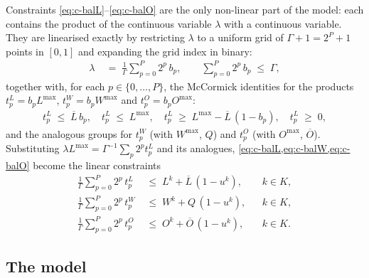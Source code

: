 \documentclass[11pt,a4paper]{article}
\theoremstyle{definition}
\theoremstyle{plain}
\newcommand{\Veh}{K}
\newcommand{\Lmax}{L^{\max}}
\newcommand{\Wmax}{W^{\max}}
\newcommand{\Omax}{O^{\max}}
\newcommand{\Lub}{\overline{L}}
\newcommand{\Oub}{\overline{O}}
\begin{document}
Constraints \eqref{eq:c-balL}--\eqref{eq:c-balO} are the only non-linear part
of the model: each contains the product of the continuous variable $\lambda$
with a continuous variable.  They are linearised exactly by restricting
$\lambda$ to a uniform grid of $\Gamma + 1 = 2^P + 1$ points in $[0,1]$ and
expanding the grid index in binary:
\begin{align}
  \lambda &\;=\; \frac{1}{\Gamma} \sum_{p=0}^{P} 2^{p}\, b_p,
  \qquad
  \sum_{p=0}^{P} 2^{p}\, b_p \;\le\; \Gamma,
  \label{eq:c-lambda-exp}
\end{align}
together with, for each $p \in \{0,\dots,P\}$, the McCormick identities for the
products $t^L_p = b_p \Lmax$, $t^W_p = b_p \Wmax$ and $t^O_p = b_p \Omax$:
\begin{align}
  t^{L}_p \;\le\; \Lub\, b_p, \quad
  t^{L}_p \;\le\; \Lmax, \quad
  t^{L}_p \;\ge\; \Lmax - \Lub\,(1 - b_p), \quad
  t^{L}_p \;\ge\; 0,
  \label{eq:c-mcL}
\end{align}
and the analogous groups for $t^W_p$ (with $\Wmax$, $Q$) and $t^O_p$ (with
$\Omax$, $\Oub$).  Substituting
$\lambda \Lmax = \Gamma^{-1} \sum_p 2^p t^L_p$ and its analogues,
\cref{eq:c-balL,eq:c-balW,eq:c-balO} become the linear constraints
\begin{align}
  \frac{1}{\Gamma} \sum_{p=0}^{P} 2^{p}\, t^{L}_p
    &\;\le\; L^k + \Lub\,(1-u^k), & &k \in \Veh,
  \label{eq:c-balL-lin}\\
  \frac{1}{\Gamma} \sum_{p=0}^{P} 2^{p}\, t^{W}_p
    &\;\le\; W^k + Q\,(1-u^k), & &k \in \Veh,
  \label{eq:c-balW-lin}\\
  \frac{1}{\Gamma} \sum_{p=0}^{P} 2^{p}\, t^{O}_p
    &\;\le\; O^k + \Oub\,(1-u^k), & &k \in \Veh.
  \label{eq:c-balO-lin}
\end{align}

\subsection{The model}
\label{sec:milp-model}
\end{document}

